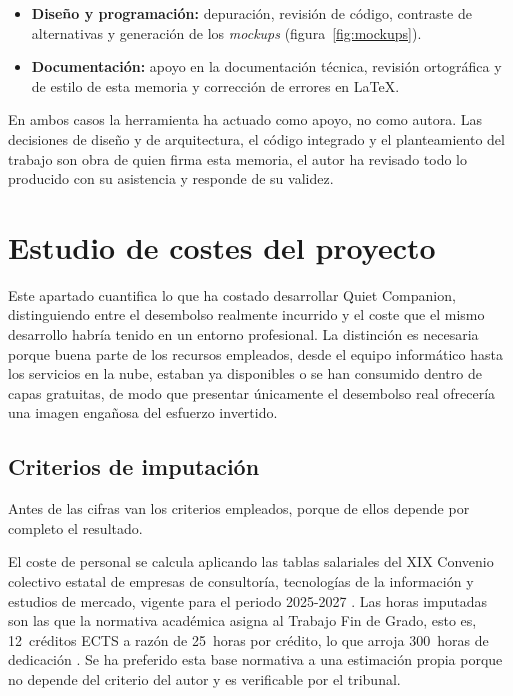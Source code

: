 \begin{itemize}
    \item \textbf{Diseño y programación:} depuración, revisión de código, contraste de alternativas y
    generación de los \emph{mockups} (figura~\ref{fig:mockups}).
    \item \textbf{Documentación:} apoyo en la documentación técnica, revisión ortográfica y de estilo de
    esta memoria y corrección de errores en \LaTeX.
\end{itemize}

En ambos casos la herramienta ha actuado como apoyo, no como autora. Las decisiones de diseño y de
arquitectura, el código integrado y el planteamiento del trabajo son obra de quien firma esta memoria, el autor
ha revisado todo lo producido con su asistencia y responde de su validez.

\section{Estudio de costes del proyecto}
\label{sec:costes}

Este apartado cuantifica lo que ha costado desarrollar Quiet Companion, distinguiendo entre el desembolso
realmente incurrido y el coste que el mismo desarrollo habría tenido en un entorno profesional. La
distinción es necesaria porque buena parte de los recursos empleados, desde el equipo informático hasta los
servicios en la nube, estaban ya disponibles o se han consumido dentro de capas gratuitas, de modo que
presentar únicamente el desembolso real ofrecería una imagen engañosa del esfuerzo invertido.

\subsection{Criterios de imputación}

Antes de las cifras van los criterios empleados, porque de ellos depende por
completo el resultado.

El coste de personal se calcula aplicando las tablas salariales del XIX Convenio colectivo estatal
de empresas de consultoría, tecnologías de la información y estudios de mercado, vigente para el periodo
2025-2027 \citep{ConvenioTIC2025}. Las horas imputadas son las que la normativa
académica asigna al Trabajo Fin de Grado, esto es, 12~créditos ECTS a razón de 25~horas por crédito, lo que
arroja 300~horas de dedicación \citep{GuiaTFG}. Se ha preferido esta base normativa a una estimación propia
porque no depende del criterio del autor y es verificable por el tribunal.


